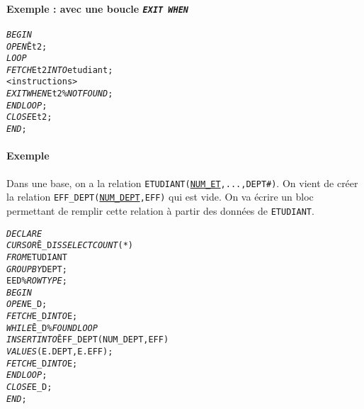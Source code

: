 \documentclass[10pt]{article}
\begin{document}
            \paragraph{Exemple : avec une boucle \emph{\texttt{EXIT WHEN}}}
                \begin{alltt}
                    \begin{tabbing}
                        \emph{BEGIN}\=\\
                            \>\emph{OPEN} \= Et2;\\
                            \>\emph{LOOP}\\
                                \>\>\emph{FETCH} Et2 \emph{INTO} etudiant;\\
                                \>\><instructions>\\
                                \>\>\emph{EXIT WHEN} Et2\%\emph{NOTFOUND};\\
                            \>\emph{END LOOP};\\
                            \>\emph{CLOSE} Et2;\\
                        \emph{END};
                    \end{tabbing}
                \end{alltt}
                
			\paragraph{Exemple}
				Dans une base, on a la relation \texttt{ETUDIANT(}\underline{\texttt{NUM\_ET}}\texttt{,...,DEPT\#)}. On vient de créer la relation \texttt{EFF\_DEPT(}\underline{\texttt{NUM\_DEPT}}\texttt{,EFF)} qui est vide. On va écrire un bloc permettant de remplir cette relation à partir des données de \texttt{ETUDIANT}.
				
				\begin{alltt}
					\begin{tabbing}
						\emph{DECLARE}\=\\
							\>\emph{CURSOR} \=E_D \emph{IS} \=\emph{SELECT} \=\emph{COUNT}(*)\\
															\>\>\emph{FROM}\>ETUDIANT\\
															\>\>\emph{GROUP BY} DEPT;\\
							\>E\>ED\%\emph{ROWTYPE};\\
						\emph{BEGIN}\\
							\>\emph{OPEN} E_D;\\
							\>\emph{FETCH} E_D \emph{INTO} E;\\
							\>\emph{WHILE} \=E_D\%\emph{FOUND LOOP}\\
								\>\>\emph{INSERT INTO} \= EFF_DEPT(NUM_DEPT,EFF)\\
								\>\>\>\emph{VALUES}(E.DEPT, E.EFF);\\
								\>\>\emph{FETCH} E_D \emph{INTO} E;\\
							\>\emph{END LOOP};\\
							\>\emph{CLOSE} E_D;
						\emph{END};
					\end{tabbing}
				\end{alltt}
				
\end{document}
